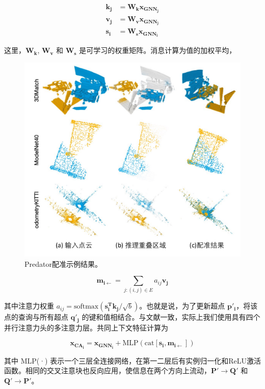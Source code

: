 \begin{equation}
\begin{aligned}
\boldsymbol{k_j} &= \boldsymbol{W_k x_{GNN_j}} \\
\boldsymbol{v_j} &= \boldsymbol{W_v x_{GNN_j}} \\
\boldsymbol{s_i} &= \boldsymbol{W_s x_{GNN_i}}
\end{aligned}
\end{equation}

这里，$\boldsymbol{W_k}$, $\boldsymbol{W_v}$ 和 $\boldsymbol{W_s}$ 是可学习的权重矩阵。消息计算为值的加权平均，

\begin{figure}
    \vspace{-5mm}
    \centering
    \includegraphics[width=0.6\linewidth]{images/PREDATOR_results.pdf}
    \caption{
        Predator配准示例结果。}
    \label{fig:predator_results}
    \vspace{-5mm}
\end{figure}

\begin{equation}
\boldsymbol{m_{i \leftarrow}} = \sum_{j:(i,j)\in E} a_{ij}\boldsymbol{v_j}
\end{equation}

其中注意力权重 $a_{ij} = \text{softmax}(\boldsymbol{s_i^T k_j}/\sqrt{b})$。也就是说，为了更新超点 $\boldsymbol{p'_i}$，将该点的查询与所有超点 $\boldsymbol{q'_j}$ 的键和值相结合。与文献一致，实际上我们使用具有四个并行注意力头的多注意力层。共同上下文特征计算为

\begin{equation}
\boldsymbol{x_{CA_i}} = \boldsymbol{x_{GNN_i}} + \text{MLP}(\text{cat}[\boldsymbol{s_i}, \boldsymbol{m_{i \leftarrow}}])
\end{equation}

其中 MLP(·) 表示一个三层全连接网络，在第一二层后有实例归一化和ReLU激活函数。相同的交叉注意块也反向应用，使信息在两个方向上流动，$\boldsymbol{P'} \rightarrow \boldsymbol{Q'}$ 和 $\boldsymbol{Q'} \rightarrow \boldsymbol{P'}$。

